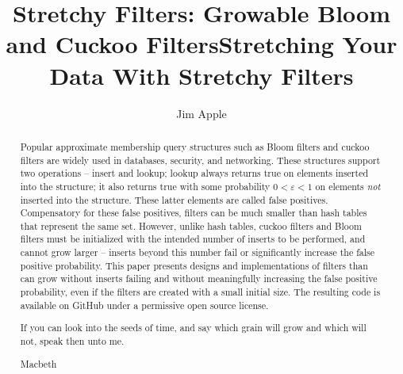 \documentclass[letterpaper,twocolumn,10pt]{article}
\newcommand{\Taffy}{Stretchy}
\newcommand{\Taffy}{Taffy}
\begin{document}
\ifanon
\title{\Large \bf \Taffy{} Filters: Growable Bloom and Cuckoo Filters}
\else
\title{\Large \bf Stretching Your Data With \Taffy{} Filters}
\fi

\ifanon
\else
\author{\rm Jim Apple}
\fi






\maketitle

\begin{abstract}
Popular approximate membership query structures such as Bloom filters and cuckoo filters are widely used in databases, security, and networking.
These structures support two operations -- insert and lookup; lookup always returns true on elements inserted into the structure; it also returns true with some probability $0 < \varepsilon < 1$ on elements {\em not} inserted into the structure.
These latter elements are called false positives.
Compensatory for these false positives, filters can be much smaller than hash tables that represent the same set.
However, unlike hash tables, cuckoo filters and Bloom filters must be initialized with the intended number of inserts to be performed, and cannot grow larger --
inserts beyond this number fail or significantly increase the false positive probability.
This paper presents designs and implementations of filters than can grow without inserts failing and without meaningfully increasing the false positive probability, even if the filters are created with a small initial size.
The resulting code is available \ifanon\else on GitHub \fi under a permissive open source license.
\ifepigraph
\epigraph{If you can look into the seeds of time, and say which grain will grow and which will not, speak then unto me.}{Macbeth}
\fi
\end{abstract}
\end{document}
